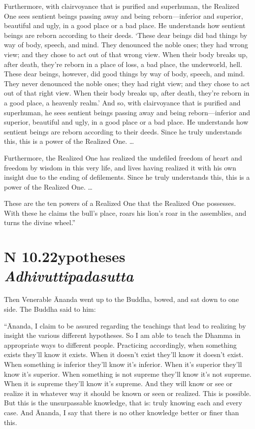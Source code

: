 \documentclass[12pt,openany]{book}%
\newcommand*{\suttatitleacronym}[1]{\smaller[2]{#1}\vspace*{.3em}}
\newcommand*{\suttatitletranslation}[1]{\linebreak{#1}}
\newcommand*{\suttatitleroot}[1]{\linebreak\smaller[2]\itshape{#1}}
\newcommand*{\tocacronym}[1]{\hspace*{-3.3em}{#1}\quad}
\newcommand*{\toctranslation}[1]{#1}
\newcommand*{\tocroot}[1]{(\textit{#1})}
\begin{document}
Furthermore, with clairvoyance that is purified and superhuman, the Realized One sees sentient beings passing away and being reborn—inferior and superior, beautiful and ugly, in a good place or a bad place. He understands how sentient beings are reborn according to their deeds. ‘These dear beings did bad things by way of body, speech, and mind. They denounced the noble ones; they had wrong view; and they chose to act out of that wrong view. When their body breaks up, after death, they’re reborn in a place of loss, a bad place, the underworld, hell. These dear beings, however, did good things by way of body, speech, and mind. They never denounced the noble ones; they had right view; and they chose to act out of that right view. When their body breaks up, after death, they’re reborn in a good place, a heavenly realm.’ And so, with clairvoyance that is purified and superhuman, he sees sentient beings passing away and being reborn—inferior and superior, beautiful and ugly, in a good place or a bad place. He understands how sentient beings are reborn according to their deeds. Since he truly understands this, this is a power of the Realized One. … 

Furthermore, the Realized One has realized the undefiled freedom of heart and freedom by wisdom in this very life, and lives having realized it with his own insight due to the ending of defilements. Since he truly understands this, this is a power of the Realized One. … 

These are the ten powers of a Realized One that the Realized One possesses. With these he claims the bull’s place, roars his lion’s roar in the assemblies, and turns the divine wheel.” 

%
\section*{{\suttatitleacronym AN 10.22}{\suttatitletranslation Hypotheses }{\suttatitleroot Adhivuttipadasutta}}
\addcontentsline{toc}{section}{\tocacronym{AN 10.22} \toctranslation{Hypotheses } \tocroot{Adhivuttipadasutta}}

Then Venerable Ānanda went up to the Buddha, bowed, and sat down to one side. The Buddha said to him: 

“Ānanda, I claim to be assured regarding the teachings that lead to realizing by insight the various different hypotheses. So I am able to teach the Dhamma in appropriate ways to different people. Practicing accordingly, when something exists they’ll know it exists. When it doesn’t exist they’ll know it doesn’t exist. When something is inferior they’ll know it’s inferior. When it’s superior they’ll know it’s superior. When something is not supreme they’ll know it’s not supreme. When it is supreme they’ll know it’s supreme. And they will know or see or realize it in whatever way it should be known or seen or realized. This is possible. But this is the unsurpassable knowledge, that is: truly knowing each and every case. And Ānanda, I say that there is no other knowledge better or finer than this. 
\end{document}
